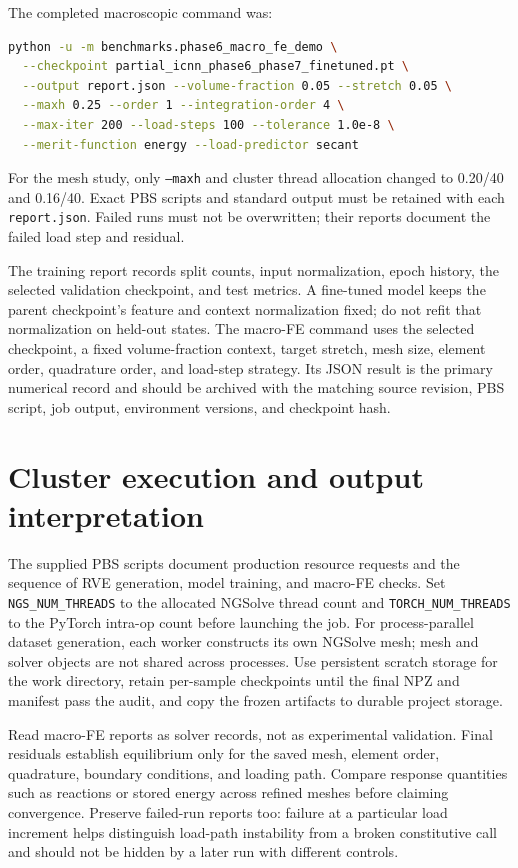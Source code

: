 The completed macroscopic command was:
\begin{lstlisting}[language=bash]
python -u -m benchmarks.phase6_macro_fe_demo \
  --checkpoint partial_icnn_phase6_phase7_finetuned.pt \
  --output report.json --volume-fraction 0.05 --stretch 0.05 \
  --maxh 0.25 --order 1 --integration-order 4 \
  --max-iter 200 --load-steps 100 --tolerance 1.0e-8 \
  --merit-function energy --load-predictor secant
\end{lstlisting}
For the mesh study, only \texttt{--maxh} and cluster thread allocation changed
to 0.20/40 and 0.16/40. Exact PBS scripts and standard output must be retained
with each \texttt{report.json}. Failed runs must not be overwritten; their
reports document the failed load step and residual.

The training report records split counts, input normalization, epoch history,
the selected validation checkpoint, and test metrics. A fine-tuned model
keeps the parent checkpoint's feature and context normalization fixed; do
not refit that normalization on held-out states. The macro-FE command uses
the selected checkpoint, a fixed volume-fraction context, target stretch,
mesh size, element order, quadrature order, and load-step strategy. Its JSON
result is the primary numerical record and should be archived with the
matching source revision, PBS script, job output, environment versions, and
checkpoint hash.

\section{Cluster execution and output interpretation}

The supplied PBS scripts document production resource requests and the
sequence of RVE generation, model training, and macro-FE checks. Set
\texttt{NGS\_NUM\_THREADS} to the allocated NGSolve thread count and
\texttt{TORCH\_NUM\_THREADS} to the PyTorch intra-op count before launching
the job. For process-parallel dataset generation, each worker constructs its
own NGSolve mesh; mesh and solver objects are not shared across processes.
Use persistent scratch storage for the work directory, retain per-sample
checkpoints until the final NPZ and manifest pass the audit, and copy the
frozen artifacts to durable project storage.

Read macro-FE reports as solver records, not as experimental validation.
Final residuals establish equilibrium only for the saved mesh, element
order, quadrature, boundary conditions, and loading path. Compare response
quantities such as reactions or stored energy across refined meshes before
claiming convergence. Preserve failed-run reports too: failure at a
particular load increment helps distinguish load-path instability from a
broken constitutive call and should not be hidden by a later run with
different controls.

